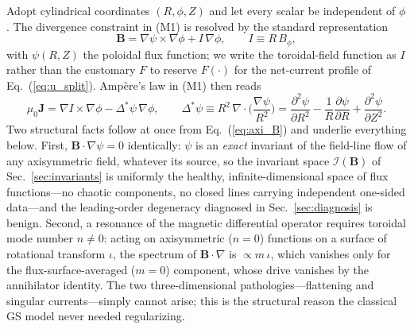\documentclass[english]{article}
\newcommand{\bB}{\mathbf{B}}
\newcommand{\bJ}{\mathbf{J}}
\begin{document}
Adopt cylindrical coordinates $(R,\phi,Z)$ and let every scalar be independent of $\phi$. The
divergence constraint in (M1) is resolved by the standard representation
\begin{equation}
\bB=\nabla\psi\times\nabla\phi+I\,\nabla\phi ,
\qquad I\equiv R\,B_\phi ,
\label{eq:axi_B}
\end{equation}
with $\psi(R,Z)$ the poloidal flux function; we write the toroidal-field function as $I$ rather
than the customary $F$ to reserve $F(\cdot)$ for the net-current profile of
Eq.~(\ref{eq:u_split}). Amp\`ere's law in (M1) then reads
\begin{equation}
\mu_0\bJ=\nabla I\times\nabla\phi-\Delta^*\psi\,\nabla\phi ,
\qquad
\Delta^*\psi\equiv R^{2}\,\nabla\cdot\!\Big(\frac{\nabla\psi}{R^{2}}\Big)
=\frac{\partial^{2}\psi}{\partial R^{2}}-\frac1R\frac{\partial\psi}{\partial R}
+\frac{\partial^{2}\psi}{\partial Z^{2}} .
\label{eq:axi_ampere}
\end{equation}
Two structural facts follow at once from Eq.~(\ref{eq:axi_B}) and underlie everything below.
First, $\bB\cdot\nabla\psi=0$ identically: $\psi$ is an \emph{exact} invariant of the field-line
flow of any axisymmetric field, whatever its source, so the invariant space $\mathcal I(\bB)$ of
Sec.~\ref{sec:invariants} is uniformly the healthy, infinite-dimensional space of flux
functions---no chaotic components, no closed lines carrying independent one-sided data---and the
leading-order degeneracy diagnosed in Sec.~\ref{sec:diagnosis} is benign. Second, a resonance of
the magnetic differential operator requires toroidal mode number $n\neq0$: acting on axisymmetric
($n=0$) functions on a surface of rotational transform $\iota$, the spectrum of $\bB\cdot\nabla$
is $\propto m\,\iota$, which vanishes only for the flux-surface-averaged ($m=0$) component, whose
drive vanishes by the annihilator identity. The two three-dimensional pathologies---flattening and
singular currents---simply cannot arise; this is the structural reason the classical GS model
never needed regularizing.
\end{document}
